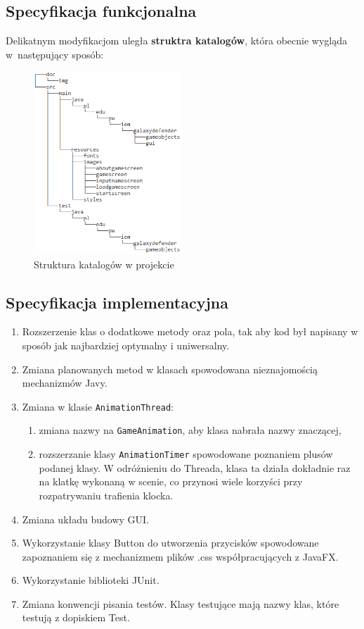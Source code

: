 \documentclass[a4paper]{article}
\newcommand{\prog}{\texttt}
\begin{document}
\subsection{Specyfikacja funkcjonalna}
Delikatnym modyfikacjom uległa \textbf{struktra katalogów}, która obecnie wygląda w~następujący sposób:
\begin{figure}[H]
    \centering
    \includegraphics[width=0.5\textwidth]{img/struktura-katalogow.png}
    \caption{Struktura katalogów w projekcie}
    \label{fig:cat}
\end{figure}

\subsection{Specyfikacja implementacyjna}
\begin{enumerate}
    \item Rozszerzenie klas o dodatkowe metody oraz pola, tak aby kod był napisany w sposób jak najbardziej optymalny i uniwersalny.
    \item Zmiana planowanych metod w klasach spowodowana nieznajomością mechanizmów Javy.
    \item Zmiana w klasie \prog{AnimationThread}:
    \begin{enumerate}
        \item zmiana nazwy na \prog{GameAnimation}, aby klasa nabrała nazwy znaczącej,
        \item rozszerzanie klasy \prog{AnimationTimer} spowodowane poznaniem plusów podanej klasy. W odróżnieniu do Threada, klasa ta działa dokładnie raz na klatkę wykonaną w scenie, co przynosi wiele korzyści przy rozpatrywaniu trafienia klocka.
    \end{enumerate}
    \item Zmiana układu budowy GUI.
    \item Wykorzystanie klasy Button do utworzenia przycisków spowodowane zapoznaniem się z mechanizmem plików .css współpracujących z JavaFX.
    \item Wykorzystanie biblioteki JUnit.
    \item Zmiana konwencji pisania testów. Klasy testujące mają nazwy klas, które testują z dopiskiem Test.
\end{enumerate}
\end{document}
